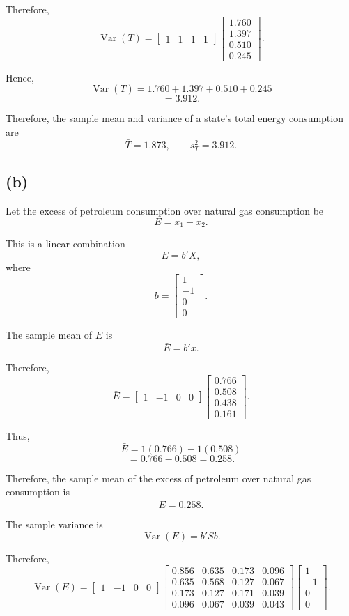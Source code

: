 \documentclass[12pt]{article}
\begin{document}
	Therefore,
	\[
	\operatorname{Var}(T)
	=
	\begin{bmatrix}
		1&1&1&1
	\end{bmatrix}
	\begin{bmatrix}
		1.760\\
		1.397\\
		0.510\\
		0.245
	\end{bmatrix}.
	\]
	
	Hence,
	\[
	\operatorname{Var}(T)
	=
	1.760+1.397+0.510+0.245
	\]
	\[
	=
	\boxed{3.912}.
	\]
	
	Therefore, the sample mean and variance of a state's total
	energy consumption are
	\[
	\boxed{\bar{T}=1.873},
	\qquad
	\boxed{s_T^2=3.912}.
	\]
	
	\subsection*{(b)}
	
	Let the excess of petroleum consumption over natural gas
	consumption be
	\[
	E=x_1-x_2.
	\]
	
	This is a linear combination
	\[
	E=b'X,
	\]
	where
	\[
	b=
	\begin{bmatrix}
		1\\
		-1\\
		0\\
		0
	\end{bmatrix}.
	\]
	
	The sample mean of \(E\) is
	\[
	\bar{E}=b'\bar{x}.
	\]
	
	Therefore,
	\[
	\bar{E}
	=
	\begin{bmatrix}
		1&-1&0&0
	\end{bmatrix}
	\begin{bmatrix}
		0.766\\
		0.508\\
		0.438\\
		0.161
	\end{bmatrix}.
	\]
	
	Thus,
	\[
	\bar{E}
	=
	1(0.766)-1(0.508)
	\]
	\[
	=
	0.766-0.508
	=
	\boxed{0.258}.
	\]
	
	Therefore, the sample mean of the excess of petroleum over
	natural gas consumption is
	\[
	\boxed{\bar{E}=0.258}.
	\]
	
	The sample variance is
	\[
	\operatorname{Var}(E)=b'Sb.
	\]
	
	Therefore,
	\[
	\operatorname{Var}(E)
	=
	\begin{bmatrix}
		1&-1&0&0
	\end{bmatrix}
	\begin{bmatrix}
		0.856&0.635&0.173&0.096\\
		0.635&0.568&0.127&0.067\\
		0.173&0.127&0.171&0.039\\
		0.096&0.067&0.039&0.043
	\end{bmatrix}
	\begin{bmatrix}
		1\\-1\\0\\0
	\end{bmatrix}.
	\]
	
\end{document}
